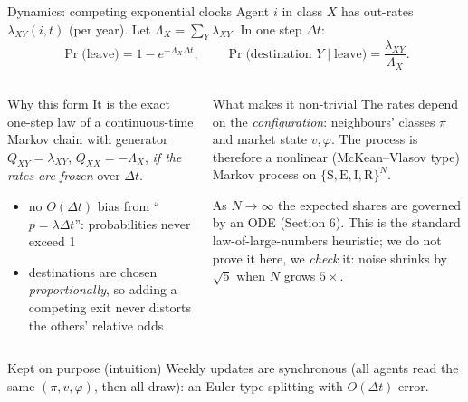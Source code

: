 ﻿\documentclass[9pt,aspectratio=169]{beamer}
\newenvironment{kept}{\begin{exampleblock}{Kept on purpose (intuition)}\small}{\end{exampleblock}}
\newcommand{\Sc}{\mathrm{S}}\newcommand{\Ec}{\mathrm{E}}\newcommand{\Ic}{\mathrm{I}}\newcommand{\Rc}{\mathrm{R}}\newcommand{\Dc}{\mathrm{D}}
\begin{document}
\begin{frame}{Dynamics: competing exponential clocks}
 Agent $i$ in class $X$ has out-rates $\lambda_{XY}(i,t)$ (per year). Let $\Lambda_X=\sum_Y\lambda_{XY}$. In one step $\Delta t$:
 \[
 \Pr\big(\text{leave}\big)=1-e^{-\Lambda_X\Delta t},\qquad
 \Pr\big(\text{destination }Y\mid\text{leave}\big)=\frac{\lambda_{XY}}{\Lambda_X}.
 \]
 \begin{columns}[T]
 \begin{block}{Why this form}\small
  It is the exact one-step law of a continuous-time Markov chain with generator $Q_{XY}=\lambda_{XY}$, $Q_{XX}=-\Lambda_X$, \emph{if the rates are frozen} over $\Delta t$.
  \begin{itemize}\setlength\itemsep{1pt}
   \item no $O(\Delta t)$ bias from ``$p=\lambda\Delta t$'': probabilities never exceed 1
   \item destinations are chosen \emph{proportionally}, so adding a competing exit never distorts the others' relative odds
  \end{itemize}
 \end{block}
 \begin{block}{What makes it non-trivial}\small
  The rates depend on the \emph{configuration}: neighbours' classes $\pi$ and market state $v,\varphi$. The process is therefore a nonlinear (McKean--Vlasov type) Markov process on $\{\Sc,\Ec,\Ic,\Rc\}^N$.
  \par\smallskip
  As $N\to\infty$ the expected shares are governed by an ODE (Section 6). This is the standard law-of-large-numbers heuristic; we do not prove it here, we \emph{check} it: noise shrinks by $\sqrt5$ when $N$ grows $5\times$.
 \end{block}
 \end{columns}
 \begin{kept}
  Weekly updates are synchronous (all agents read the same $(\pi,v,\varphi)$, then all draw): an Euler-type splitting with $O(\Delta t)$ error.
 \end{kept}
\end{frame}

\end{document}
